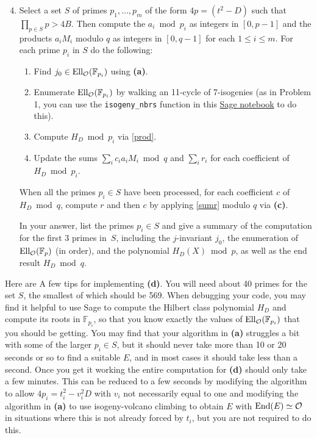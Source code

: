\documentclass[11pt]{article}
\newcommand{\Fp}{\mathbb{F}_p}
\newcommand{\F}{\mathbb{F}}
\newcommand{\End}{{\rm End}}
\renewcommand{\O}{\mathcal{O}}
\newcommand{\EllO}{{\rm Ell}_\O}
\begin{document}
\begin{enumerate}[{\bf(a)}]
\setcounter{enumi}{3}
\item
Select a set $S$ of primes $p_1,\ldots,p_m$ of the form $4p=(t^2-D)$ such that $\prod_{p\in S}p > 4B$. Then compute the $a_i\bmod p_i$ as integers in $[0,p-1]$ and the products $a_iM_i$ modulo $q$ as integers in $[0,q-1]$ for each $1\le i\le m$.
For each prime $p_i$ in $S$ do the following:
\begin{enumerate}[1.]
\setlength{\itemsep}{0pt}
\item Find $j_0\in\EllO(\F_{p_i})$ using \textbf{(a)}.
\item Enumerate $\EllO(\F_{p_i})$ by walking an 11-cycle of 7-isogenies (as in Problem 1, you can use the \texttt{isogeny\_nbrs} function in this \href{https://cocalc.com/share/public_paths/e2a45f293be2d00354622ee999c2dc3801c0caba}{Sage notebook} to do this).
\item Compute $H_D\bmod p_i$ via \eqref{prod}.
\item Update the sums $\sum_i c_ia_iM_i\bmod q$ and $\sum_i r_i$ for each coefficient of $H_D\bmod p_i$.
\end{enumerate}
When all the primes $p_i\in S$ have been processed, for each coefficient $c$ of $H_D\bmod q$, compute $r$ and then $c$ by applying \eqref{sumr} modulo $q$ via \textbf{(c)}.

In your answer, list the primes $p_i\in S$ and give a summary of the computation for the first 3 primes in~$S$, including the $j$-invariant $j_0$, the enumeration of $\EllO(\Fp)$ (in order), and the polynomial $H_D(X)\bmod p$, as well as the end result $H_D\bmod q$.
\end{enumerate}

Here are A few tips for implementing \textbf{(d)}. You will need about 40 primes for the set $S$, the smallest of which should be 569.  When debugging your code, you may find it helpful to use Sage to compute the Hilbert class polynomial $H_D$ and compute its roots in $\F_{p_i}$, so that you know exactly the values of $\EllO(\F_{p_i})$ that you should be getting.  You may find that your algorithm in \textbf{(a)} struggles a bit with some of the larger $p_i\in S$, but it should never take more than 10 or 20 seconds or so to find a suitable $E$, and in most cases it should take less than a second.  Once you get it working the entire computation for \textbf{(d)} should only take a few minutes.  This can be reduced to a few seconds by modifying the algorithm to allow $4p_i=t_i^2-v_i^2D$ with $v_i$ not necessarily equal to one and modifying the algorithm in \textbf{(a)} to use isogeny-volcano climbing to obtain $E$ with $\End(E)\simeq \O$ in situations where this is not already forced by $t_i$, but you are not required to do this.
\end{document}

